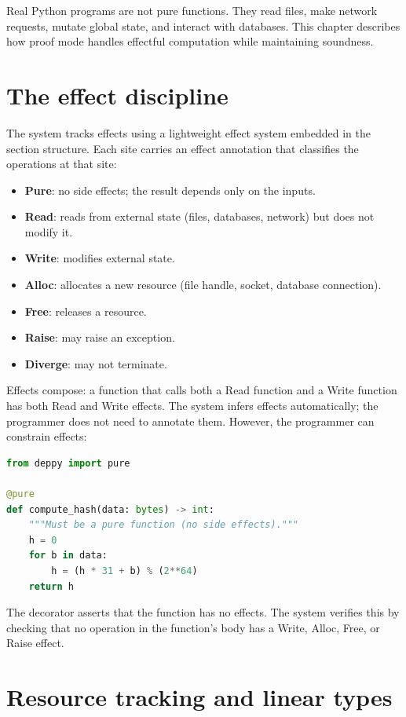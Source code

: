 \documentclass[11pt]{report}
\DeclareRobustCommand{\py}[1]{\texttt{\detokenize{#1}}}
\theoremstyle{definition}
\theoremstyle{plain}
\begin{document}
Real Python programs are not pure functions. They read files, make network
requests, mutate global state, and interact with databases. This chapter
describes how proof mode handles effectful computation while maintaining
soundness.

\section{The effect discipline}

The system tracks effects using a lightweight effect system embedded in the
section structure. Each site carries an effect annotation that classifies the
operations at that site:

\begin{itemize}[nosep]
  \item \textbf{Pure}: no side effects; the result depends only on the inputs.
  \item \textbf{Read}: reads from external state (files, databases, network)
        but does not modify it.
  \item \textbf{Write}: modifies external state.
  \item \textbf{Alloc}: allocates a new resource (file handle, socket,
        database connection).
  \item \textbf{Free}: releases a resource.
  \item \textbf{Raise}: may raise an exception.
  \item \textbf{Diverge}: may not terminate.
\end{itemize}

Effects compose: a function that calls both a Read function and a Write
function has both Read and Write effects. The system infers effects
automatically; the programmer does not need to annotate them. However, the
programmer can constrain effects:

\begin{lstlisting}[style=deppy,language=Python]
from deppy import pure

@pure
def compute_hash(data: bytes) -> int:
    """Must be a pure function (no side effects)."""
    h = 0
    for b in data:
        h = (h * 31 + b) % (2**64)
    return h
\end{lstlisting}

The \py{@pure} decorator asserts that the function has no effects. The system
verifies this by checking that no operation in the function's body has a
Write, Alloc, Free, or Raise effect.

\section{Resource tracking and linear types}
\end{document}
